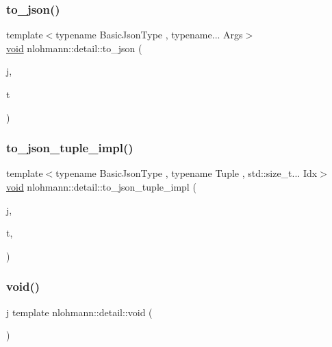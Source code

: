 \subsubsection{\texorpdfstring{to\_json()}{to\_json()}\hspace{0.1cm}{\footnotesize\ttfamily [17/17]}}
{\footnotesize\ttfamily template$<$typename Basic\+Json\+Type , typename... Args$>$ \\
\mbox{\hyperlink{namespacenlohmann_1_1detail_a59fca69799f6b9e366710cb9043aa77d}{void}} nlohmann\+::detail\+::to\+\_\+json (\begin{DoxyParamCaption}\item[{Basic\+Json\+Type \&}]{j,  }\item[{const std\+::tuple$<$ Args... $>$ \&}]{t }\end{DoxyParamCaption})}

\mbox{\label{namespacenlohmann_1_1detail_a510dfa15b01e9a8afe31600a27b28199}} 
\subsubsection{\texorpdfstring{to\_json\_tuple\_impl()}{to\_json\_tuple\_impl()}}
{\footnotesize\ttfamily template$<$typename Basic\+Json\+Type , typename Tuple , std\+::size\+\_\+t... Idx$>$ \\
\mbox{\hyperlink{namespacenlohmann_1_1detail_a59fca69799f6b9e366710cb9043aa77d}{void}} nlohmann\+::detail\+::to\+\_\+json\+\_\+tuple\+\_\+impl (\begin{DoxyParamCaption}\item[{Basic\+Json\+Type \&}]{j,  }\item[{const Tuple \&}]{t,  }\item[{\mbox{\hyperlink{structnlohmann_1_1detail_1_1index__sequence}{index\+\_\+sequence}}$<$ Idx... $>$}]{ }\end{DoxyParamCaption})}

\mbox{\label{namespacenlohmann_1_1detail_a59fca69799f6b9e366710cb9043aa77d}} 
\subsubsection{\texorpdfstring{void()}{void()}}
{\footnotesize\ttfamily j template nlohmann\+::detail\+::void (\begin{DoxyParamCaption}{ }\end{DoxyParamCaption})}

